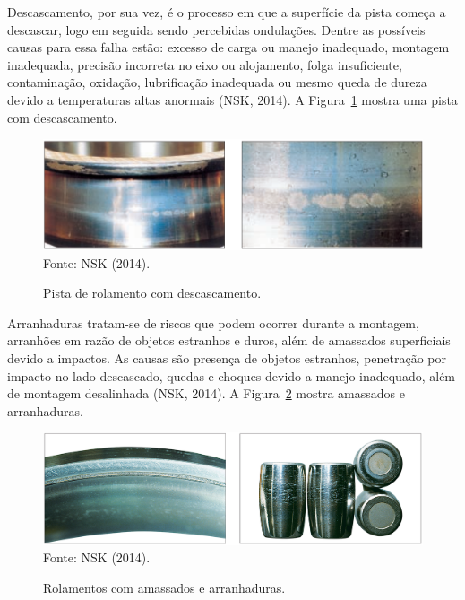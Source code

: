 \documentclass[
	12pt,				
	oneside,			
	a4paper,			
	english,			
	brazil,			
	]{abntex2ppgsi}
\begin{document}
Descascamento, por sua vez, é o processo em que a superfície da pista começa a descascar, logo em seguida sendo percebidas ondulações. Dentre as possíveis causas para essa falha estão: excesso de carga ou manejo inadequado, montagem inadequada, precisão incorreta no eixo ou alojamento, folga insuficiente, contaminação, oxidação, lubrificação inadequada ou mesmo queda de dureza devido a temperaturas altas anormais (NSK, 2014). A Figura~\ref{descascamento_nsk} mostra uma pista com descascamento.

\begin{figure}[H]
\centering
\caption {Pista de rolamento com descascamento.}
\includegraphics[width=\textwidth,height=\textheight,keepaspectratio]{descascamento_nsk} \\
Fonte: NSK (2014).
\label{descascamento_nsk}
\end{figure}

Arranhaduras tratam-se de riscos que podem ocorrer durante a montagem, arranhões em razão de objetos estranhos e duros, além de amassados superficiais devido a impactos. As causas são presença de objetos estranhos, penetração por impacto no lado descascado, quedas e choques devido a manejo inadequado, além de montagem desalinhada (NSK, 2014). A Figura~\ref{arranhaduras_nsk} mostra amassados e arranhaduras. 

\begin{figure}[H]
\centering
\caption {Rolamentos com amassados e arranhaduras.}
\includegraphics[width=\textwidth,height=\textheight,keepaspectratio]{arranhaduras_nsk} \\
Fonte: NSK (2014).
\label{arranhaduras_nsk}
\end{figure}
\end{document}
